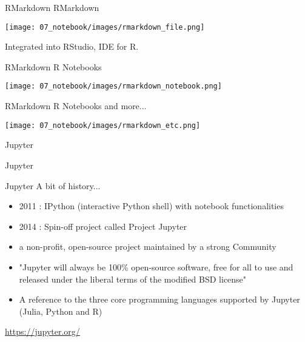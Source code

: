 \begin{frame}{RMarkdown}
RMarkdown

\begin{center}
    \texttt{[image: 07\_notebook/images/rmarkdown\_file.png]}
\end{center}

Integrated into RStudio, IDE for R.

\end{frame}

\begin{frame}{RMarkdown}
R Notebooks

\begin{center}
    \texttt{[image: 07\_notebook/images/rmarkdown\_notebook.png]}
\end{center}


\end{frame}

\begin{frame}{RMarkdown}
R Notebooks and more...

\begin{center}
    \texttt{[image: 07\_notebook/images/rmarkdown\_etc.png]}
\end{center}

\end{frame}

\begin{frame}{Jupyter}

\huge{Jupyter}

\end{frame}

\begin{frame}{Jupyter}
A bit of history...
\begin{itemize}
    \item 2011 : IPython (interactive Python shell) with notebook functionalities
    \item 2014 : Spin-off project called Project Jupyter
    \item a non-profit, open-source project maintained by a strong Community
    \item "Jupyter will always be 100\% open-source software, free for all to use and released under the liberal terms of the modified BSD license"
    \item A reference to the three core programming languages supported by Jupyter (Julia, Python and R)
\end{itemize}

\url{https://jupyter.org/}

\end{frame}

